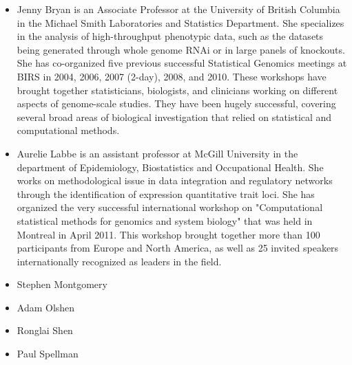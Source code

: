 \documentclass[12pt]{amsart}
\begin{document}
\begin{itemize}
\item Jenny Bryan is an Associate Professor at the University of
  British Columbia in the Michael Smith Laboratories and Statistics
  Department. She specializes in the analysis of high-throughput
  phenotypic data, such as the datasets being generated through whole
  genome RNAi or in large panels of knockouts. She has co-organized
  five previous successful Statistical Genomics meetings at BIRS in
  2004, 2006, 2007 (2-day), 2008, and 2010. These workshops have
  brought together statisticians, biologists, and clinicians working
  on different aspects of genome-scale studies. They have been hugely
  successful, covering several broad areas of biological investigation
  that relied on statistical and computational methods.

\item Aurelie Labbe is an assistant professor at McGill University in
  the department of Epidemiology, Biostatistics and Occupational
  Health. She works on methodological issue in data integration and
  regulatory networks through the identification of expression
  quantitative trait loci. She has organized the very successful
  international workshop on "Computational statistical methods for
  genomics and system biology" that was held in Montreal in April
  2011. This workshop brought together more than 100 participants from
  Europe and North America, as well as 25 invited speakers
  internationally recognized as leaders in the field.

\item Stephen Montgomery
\item Adam Olshen
\item Ronglai Shen 
\item Paul Spellman 


\end{itemize}


\end{document}
